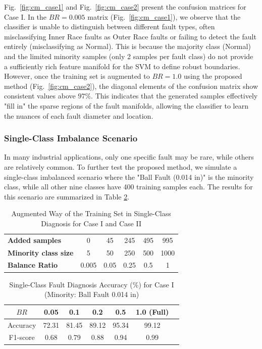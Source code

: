 Fig.~\ref{fig:cm_case1} and Fig.~\ref{fig:cm_case2} present the confusion matrices for Case I. In the $BR=0.005$ matrix (Fig.~\ref{fig:cm_case1}), we observe that the classifier is unable to distinguish between different fault types, often misclassifying Inner Race faults as Outer Race faults or failing to detect the fault entirely (misclassifying as Normal). This is because the majority class (Normal) and the limited minority samples (only 2 samples per fault class) do not provide a sufficiently rich feature manifold for the SVM to define robust boundaries. However, once the training set is augmented to $BR=1.0$ using the proposed method (Fig.~\ref{fig:cm_case2}), the diagonal elements of the confusion matrix show consistent values above $97\%$. This indicates that the generated samples effectively "fill in" the sparse regions of the fault manifolds, allowing the classifier to learn the nuances of each fault diameter and location.

\subsubsection{Single-Class Imbalance Scenario}
In many industrial applications, only one specific fault may be rare, while others are relatively common. To further test the proposed method, we simulate a single-class imbalanced scenario where the "Ball Fault (0.014 in)" is the minority class, while all other nine classes have 400 training samples each. The results for this scenario are summarized in Table \ref{tab:single_case1}.

\begin{table}[htbp]
\centering
\caption{Augmented Way of the Training Set in Single-Class Diagnosis for Case I and Case II}
\label{tab:aug_single}
\begin{tabular}{lccccc}
\hline
\textbf{Added samples} & 0 & 45 & 245 & 495 & 995 \\
\textbf{Minority class size} & 5 & 50 & 250 & 500 & 1000 \\
\textbf{Balance Ratio} & 0.005 & 0.05 & 0.25 & 0.5 & 1 \\
\hline
\end{tabular}
\end{table}

\begin{table}[htbp]
\centering
\caption{Single-Class Fault Diagnosis Accuracy (\%) for Case I (Minority: Ball Fault 0.014 in)}
\label{tab:single_case1}
\begin{tabular}{ccccccc}
\hline
$BR$ & 0.05 & 0.1 & 0.2 & 0.5 & 1.0 (Full) \\ \hline
Accuracy & 72.31 & 81.45 & 89.12 & 95.34 & 99.12 \\
F1-score & 0.68  & 0.79  & 0.88  & 0.94  & 0.99 \\
\hline
\end{tabular}
\end{table}

